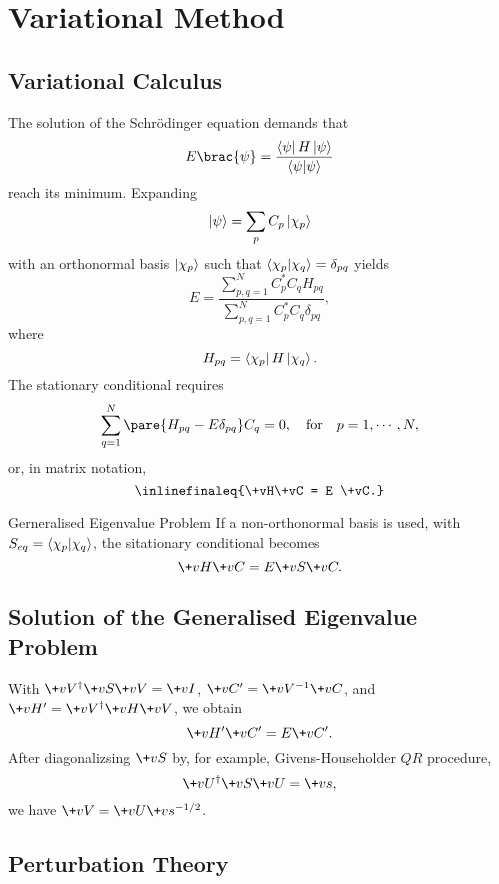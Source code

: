 \documentclass[hidelinks]{article}
\begin{document}
\section{Variational Method} %
\label{sec:variational_method}

\subsection{Variational Calculus} %
\label{sub:variational_calculus}

The solution of the Schr\"odinger equation demands that
\[ E\brac{\psi} = \frac{\bra{\psi}H\ket{\psi}}{\bra{\psi}\ket{\psi}} \]
reach its minimum. Expanding
\[ \ket{\psi} = \sum_p C_p\ket{\chi_p} \]
with an orthonormal basis $\ket{\chi_p}$ such that $\bra{\chi_p}\ket{\chi_q} = \delta_{pq}$ yields
\[ E = \frac{\sum_{p,q=1}^N C^*_p C_q H_{pq}}{\sum_{p,q=1}^N C^*_p C_q \delta_{pq}}, \]
where
\[ H_{pq} = \bra{\chi_p}H\ket{\chi_q}. \]
The stationary conditional requires
\[ \sum_{q=1}^N \pare{H_{pq} - E\delta_{pq}} C_q = 0,\quad \mathrm{for}\quad p=1,\cdots,N, \]
or, in matrix notation,
\[ \inlinefinaleq{\+vH\+vC = E \+vC.} \]
\vspace{-\baselineskip}
\begin{finaleq}{Gerneralised Eigenvalue Problem}
    If a non-orthonormal basis is used, with $S_{eq} = \bra{\chi_p}\ket{\chi_q}$, the sitationary conditional becomes
    \[ \+vH\+vC = E\+vS\+vC. \]
\end{finaleq}


\subsection{Solution of the Generalised Eigenvalue Problem} %
\label{sub:solution_of_the_generalised_eigenvalue_problem}

With $\+vV^\dagger \+vS \+vV = \+vI$, $\+vC' = \+vV^{-1}\+vC$, and $\+vH' = \+vV^\dagger \+vH \+vV$, we obtain
\[ \+vH'\+vC' = E \+vC'. \]
After diagonalizsing $\+vS$ by, for example, Givens-Householder $QR$ procedure,
\[ \+vU^\dagger \+vS \+vU = \+vs, \]
we have $\+vV = \+vU \+vs^{-1/2}$.


\subsection{Perturbation Theory} %
\label{sub:perturbation_theory}
\end{document}
